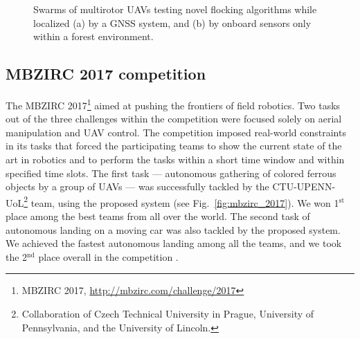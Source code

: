 \documentclass[a4paper,11pt,titlepage,twoside]{book}
\newcommand{\reffig}[1]{Fig.~\ref{#1}}
\begin{document}
\begin{figure}
{}
  \caption{Swarms of multirotor \acp{UAV} testing novel flocking algorithms while localized (a) by a \ac{GNSS} system, and (b) by onboard sensors only within a forest environment.}
  \label{fig:swarms}
\end{figure}



\subsection{MBZIRC 2017 competition}

The \ac{MBZIRC} 2017\footnote{MBZIRC 2017, \url{http://mbzirc.com/challenge/2017}} aimed at pushing the frontiers of field robotics.
Two tasks out of the three challenges within the competition were focused solely on aerial manipulation and UAV control.
The competition imposed real-world constraints in its tasks that forced the participating teams to show the current state of the art in robotics and to perform the tasks within a short time window and within specified time slots.
The first task --- autonomous gathering of colored ferrous objects by a group of \acp{UAV} --- was successfully tackled by the CTU-UPENN-UoL\footnote{Collaboration of Czech Technical University in Prague, University of Pennsylvania, and the University of Lincoln.} team, using the proposed system \cite{spurny2019cooperative, faigl2019unsupervised, loianno2018localization} (see \reffig{fig:mbzirc_2017}).
We won 1$^{\mathrm{st}}$ place among the best teams from all over the world.
The second task of autonomous landing on a moving car was also tackled by the proposed system.
We achieved the fastest autonomous landing among all the teams, and we took the 2$^{\text{nd}}$ place overall in the competition \cite{baca2019autonomous, stepan2019vision}.
\end{document}
